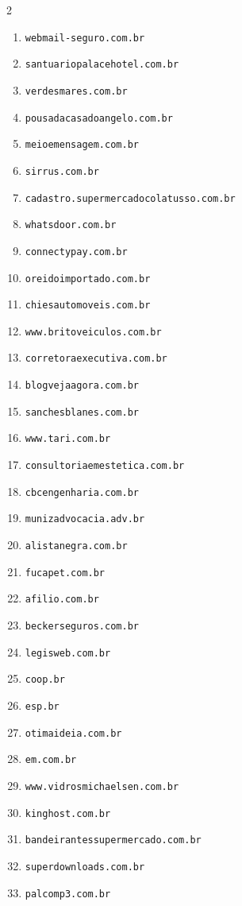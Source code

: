 \begin{multicols}{2}
\begin{enumerate}
    \item \texttt{webmail-seguro.com.br}
    \item \texttt{santuariopalacehotel.com.br}
    \item \texttt{verdesmares.com.br}
    \item \texttt{pousadacasadoangelo.com.br}
    \item \texttt{meioemensagem.com.br}
    \item \texttt{sirrus.com.br}
    \item \texttt{cadastro.supermercadocolatusso.com.br}
    \item \texttt{whatsdoor.com.br}
    \item \texttt{connectypay.com.br}
    \item \texttt{oreidoimportado.com.br}
    \item \texttt{chiesautomoveis.com.br}
    \item \texttt{www.britoveiculos.com.br}
    \item \texttt{corretoraexecutiva.com.br}
    \item \texttt{blogvejaagora.com.br}
    \item \texttt{sanchesblanes.com.br}
    \item \texttt{www.tari.com.br}
    \item \texttt{consultoriaemestetica.com.br}
    \item \texttt{cbcengenharia.com.br}
    \item \texttt{munizadvocacia.adv.br}
    \item \texttt{alistanegra.com.br}
    \item \texttt{fucapet.com.br}
    \item \texttt{afilio.com.br}
    \item \texttt{beckerseguros.com.br}
    \item \texttt{legisweb.com.br}
    \item \texttt{coop.br}
    \item \texttt{esp.br}
    \item \texttt{otimaideia.com.br}
    \item \texttt{em.com.br}
    \item \texttt{www.vidrosmichaelsen.com.br}
    \item \texttt{kinghost.com.br}
    \item \texttt{bandeirantessupermercado.com.br}
    \item \texttt{superdownloads.com.br}
    \item \texttt{palcomp3.com.br}

\end{enumerate}
\end{multicols}
